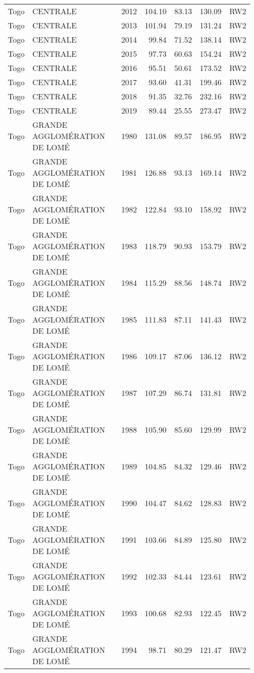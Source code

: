 \begin{longtable}{lllrrrl}
  Togo & CENTRALE & 2012 & 104.10 & 83.13 & 130.09 & RW2 \\ 
  Togo & CENTRALE & 2013 & 101.94 & 79.19 & 131.24 & RW2 \\ 
  Togo & CENTRALE & 2014 & 99.84 & 71.52 & 138.14 & RW2 \\ 
  Togo & CENTRALE & 2015 & 97.73 & 60.63 & 154.24 & RW2 \\ 
  Togo & CENTRALE & 2016 & 95.51 & 50.61 & 173.52 & RW2 \\ 
  Togo & CENTRALE & 2017 & 93.60 & 41.31 & 199.46 & RW2 \\ 
  Togo & CENTRALE & 2018 & 91.35 & 32.76 & 232.16 & RW2 \\ 
  Togo & CENTRALE & 2019 & 89.44 & 25.55 & 273.47 & RW2 \\ 
  Togo & GRANDE AGGLOMÉRATION DE LOMÉ & 1980 & 131.08 & 89.57 & 186.95 & RW2 \\ 
  Togo & GRANDE AGGLOMÉRATION DE LOMÉ & 1981 & 126.88 & 93.13 & 169.14 & RW2 \\ 
  Togo & GRANDE AGGLOMÉRATION DE LOMÉ & 1982 & 122.84 & 93.10 & 158.92 & RW2 \\ 
  Togo & GRANDE AGGLOMÉRATION DE LOMÉ & 1983 & 118.79 & 90.93 & 153.79 & RW2 \\ 
  Togo & GRANDE AGGLOMÉRATION DE LOMÉ & 1984 & 115.29 & 88.56 & 148.74 & RW2 \\ 
  Togo & GRANDE AGGLOMÉRATION DE LOMÉ & 1985 & 111.83 & 87.11 & 141.43 & RW2 \\ 
  Togo & GRANDE AGGLOMÉRATION DE LOMÉ & 1986 & 109.17 & 87.06 & 136.12 & RW2 \\ 
  Togo & GRANDE AGGLOMÉRATION DE LOMÉ & 1987 & 107.29 & 86.74 & 131.81 & RW2 \\ 
  Togo & GRANDE AGGLOMÉRATION DE LOMÉ & 1988 & 105.90 & 85.60 & 129.99 & RW2 \\ 
  Togo & GRANDE AGGLOMÉRATION DE LOMÉ & 1989 & 104.85 & 84.32 & 129.46 & RW2 \\ 
  Togo & GRANDE AGGLOMÉRATION DE LOMÉ & 1990 & 104.47 & 84.62 & 128.83 & RW2 \\ 
  Togo & GRANDE AGGLOMÉRATION DE LOMÉ & 1991 & 103.66 & 84.89 & 125.80 & RW2 \\ 
  Togo & GRANDE AGGLOMÉRATION DE LOMÉ & 1992 & 102.33 & 84.44 & 123.61 & RW2 \\ 
  Togo & GRANDE AGGLOMÉRATION DE LOMÉ & 1993 & 100.68 & 82.93 & 122.45 & RW2 \\ 
  Togo & GRANDE AGGLOMÉRATION DE LOMÉ & 1994 & 98.71 & 80.29 & 121.47 & RW2 \\ 

\end{longtable}
